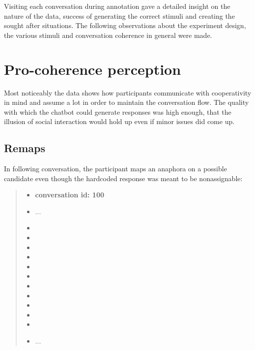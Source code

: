 Visiting each conversation during annotation
gave a detailed insight on the nature of the data,
success of generating the correct stimuli and
creating the sought after situations.
The following observations about
the experiment design, the various stimuli and conversation coherence in general
were made.

\section{Pro-coherence perception}

Most noticeably the data shows how participants communicate with cooperativity in mind
and assume a lot in order to maintain the conversation flow.
The quality with which the chatbot could generate responses was high enough,
that the illusion of social interaction would hold up even if minor issues did come up.

\subsection{Remaps}

In following conversation, the participant maps an anaphora on a possible candidate
even though the hardcoded response was meant to be nonassignable:

    \begin{quote}
    \begin{itemize}[label={}, leftmargin=0pt, itemsep=0.5em]
    \item \textbf{conversation id: 100}
    \item ...
    \item {}
    \item {}
    \item {}
    \item {}
    \item {}
    \item {}
    \item {}
    \item {}
    \item {}
    \item {}
    \item {}
    \item ...
    \end{itemize}
    \end{quote}


